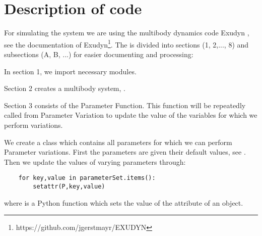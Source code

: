 \section{Description of code}
For simulating the system we are using the multibody dynamics code Exudyn \cite{Gerstmayr2022}, see the documentation of Exudyn\footnote{https://github.com/jgerstmayr/EXUDYN}.
%
The  is divided into sections (1, 2,..., 8) and subsections (A, B, ...) for easier documenting and processing: %
\bi 
\item{In section 1, we import necessary modules.}
\item{Section 2 creates a multibody system, .}
\item{Section 3 consists of the Parameter Function. This function will be repeatedly called from Parameter Variation to update the value of the variables for which we perform variations.} 
\bi
\item{
We create a class  which contains all parameters for which we can perform Parameter variations. First the parameters are given their default values, see . Then we update the values of varying parameters through:
\pythonstyle
\begin{lstlisting}
	for key,value in parameterSet.items():
		setattr(P,key,value)
\end{lstlisting}		
where  is a Python function which sets the value of the attribute of an object.}
%
